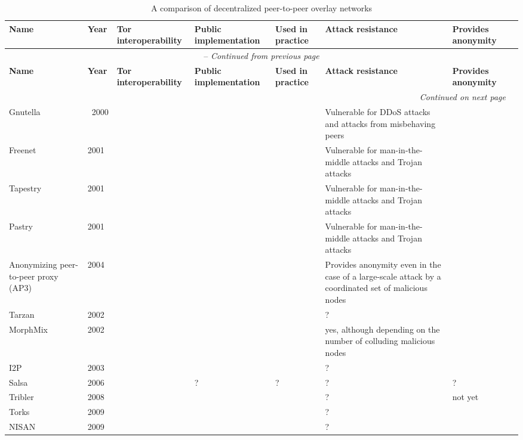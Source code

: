 \begin{landscape}

\begin{center}
    \begin{longtable}{ | p{1.9cm} | p{0.8cm} | p{1.6cm} | p{2.2cm} | p{2.0cm} | p{2cm} | p{2cm} | p{2cm} |}
  		\caption{A comparison of decentralized peer-to-peer overlay networks} \\ \hline
	    \textbf{Name} & \textbf{Year} & \textbf{Tor interoperability} & \textbf{Public implementation} & \textbf{Used in practice} & \textbf{Attack resistance} & \textbf{Provides anonymity} \\ \hline
		\endfirsthead
		\multicolumn{7}{c}{\tablename\ \thetable\ -- \textit{Continued from previous page}} \\ \hline
	    \textbf{Name} & \textbf{Year} & \textbf{Tor interoperability} & \textbf{Public implementation} & \textbf{Used in practice} & \textbf{Attack resistance} & \textbf{Provides anonymity} \\ \hline
		\endhead
		\hline \multicolumn{7}{r}{\textit{Continued on next page}} \\
		\endfoot
		\hline
		\endlastfoot
	    
		Gnutella & ~2000 & & \checkmark & \checkmark & Vulnerable for DDoS attacks and attacks from misbehaving peers & \\ \hline
		Freenet & 2001 & & \checkmark & \checkmark & Vulnerable for man-in-the-middle attacks and Trojan attacks & \checkmark\\ \hline
		Tapestry & 2001 & & \checkmark & \checkmark & Vulnerable for man-in-the-middle attacks and Trojan attacks & \\ \hline
		Pastry & 2001 & & \checkmark & \checkmark & Vulnerable for man-in-the-middle attacks and Trojan attacks & \\ \hline
		Anonymizing peer-to-peer proxy (AP3) & 2004 & & & & Provides anonymity even in the case of a large-scale attack by a coordinated set of malicious nodes & \checkmark\\ \hline
		Tarzan & 2002 & & & & ? & \checkmark\\ \hline
		MorphMix & 2002 & & \checkmark & & yes, although depending on the number of colluding malicious nodes & \checkmark\\ \hline
		I2P & 2003 & & \checkmark & \checkmark & ? & \checkmark\\ \hline
		Salsa & 2006 & & ? & ? & ? & ?\\ \hline
		Tribler & 2008 & & \checkmark & \checkmark & ? & not yet\\ \hline
		Torks & 2009 & \checkmark & & & ? & \checkmark\\ \hline
		NISAN & 2009 & & & & ? & \checkmark\\ \hline
    \end{longtable}
\end{center}

\end{landscape}